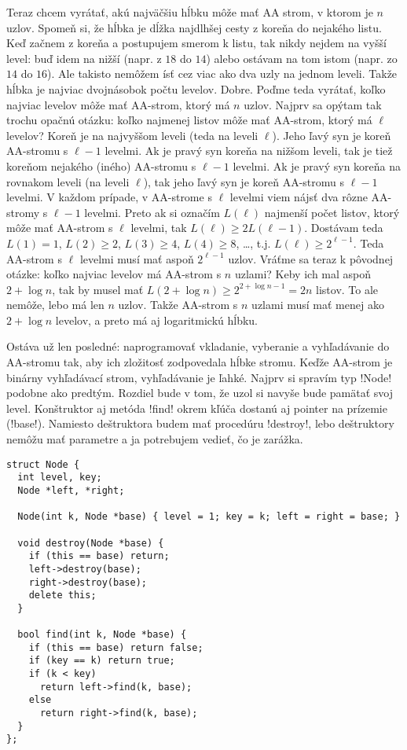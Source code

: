Teraz chcem vyrátať, akú najväčšiu hĺbku môže mať AA strom, v ktorom je $n$ uzlov. Spomeň si,
že hĺbka je dĺžka najdlhšej cesty z koreňa do nejakého listu. Keď začnem z koreňa a postupujem
smerom k listu, tak nikdy nejdem na vyšší level: buď idem na nižší (napr. z $18$ do
$14$) alebo ostávam na tom istom (napr. zo $14$ do $16$). Ale takisto nemôžem ísť
cez viac ako dva uzly na jednom leveli. Takže hĺbka je najviac dvojnásobok počtu levelov.
Dobre. Poďme teda vyrátať, koľko najviac levelov môže mať AA-strom, ktorý má $n$ uzlov. 
Najprv sa opýtam tak trochu opačnú otázku: 
koľko najmenej listov môže mať AA-strom, ktorý má $\ell$ levelov?
Koreň je na najvyššom leveli (teda na leveli $\ell$). 
Jeho ľavý syn je koreň AA-stromu s $\ell-1$ levelmi. Ak je
pravý syn koreňa na nižšom leveli, tak je tiež
koreňom nejakého (iného) AA-stromu s $\ell-1$ levelmi.
Ak je pravý syn koreňa na rovnakom leveli (na leveli $\ell$), tak jeho ľavý syn je koreň 
AA-stromu s $\ell-1$ levelmi. V každom prípade, v AA-strome s $\ell$ levelmi
viem nájsť dva rôzne AA-stromy
s $\ell-1$ levelmi. Preto ak si označím $L(\ell)$ najmenší počet listov, ktorý môže
mať AA-strom s $\ell$ levelmi, tak $L(\ell)\ge2L(\ell-1)$.
Dostávam teda $L(1)=1$, $L(2)\ge2$, $L(3)\ge4$, $L(4)\ge8$, \ldots, t.j. 
$L(\ell)\ge2^{\ell-1}$. Teda AA-strom s $\ell$ levelmi musí mať aspoň $2^{\ell-1}$
uzlov. Vráťme sa teraz k pôvodnej otázke: koľko najviac levelov má AA-strom s $n$ uzlami?
Keby ich mal aspoň $2+\log n$, tak by musel mať 
$L(2+\log n)\ge2^{2+\log n-1}=2n$ listov. To ale nemôže, lebo má len $n$ uzlov. Takže
AA-strom s $n$ uzlami musí mať menej ako $2+\log n$ levelov, a preto má aj logaritmickú hĺbku.


Ostáva už len posledné: naprogramovať vkladanie, vyberanie a vyhľadávanie do AA-stromu tak,
aby ich zložitosť zodpovedala hĺbke stromu. Keďže AA-strom je binárny vyhľadávací strom,
vyhľadávanie je ľahké. Najprv si spravím typ \prg!Node! podobne ako predtým. Rozdiel
bude v tom, že uzol si navyše bude pamätať svoj level. Konštruktor aj metóda
\prg!find! okrem kľúča dostanú aj pointer na prízemie (\prg!base!).
Namiesto deštruktora budem mať procedúru \prg!destroy!, lebo deštruktory nemôžu
mať parametre a ja potrebujem vedieť, čo je zarážka.


\begin{lstlisting}
struct Node {
  int level, key;
  Node *left, *right;

  Node(int k, Node *base) { level = 1; key = k; left = right = base; }

  void destroy(Node *base) {
    if (this == base) return;
    left->destroy(base);
    right->destroy(base);
    delete this;
  }

  bool find(int k, Node *base) {
    if (this == base) return false;
    if (key == k) return true;
    if (k < key)
      return left->find(k, base);
    else
      return right->find(k, base);
  }
};
\end{lstlisting}

